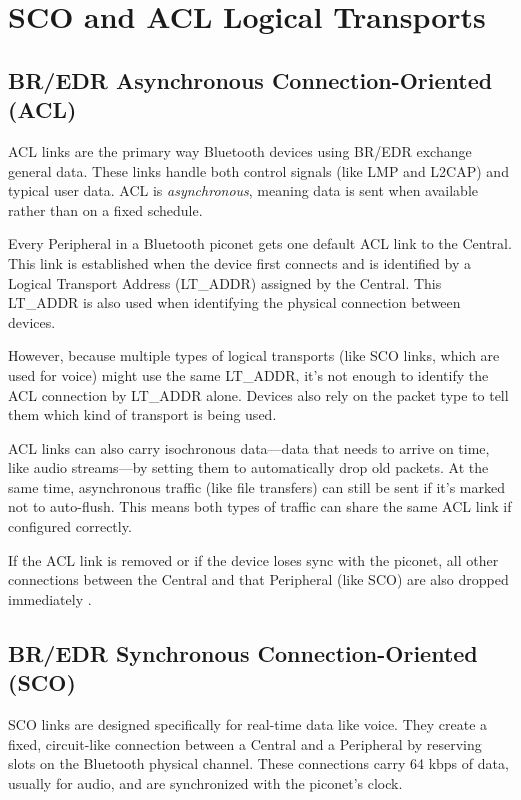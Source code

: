 \section{SCO and ACL Logical Transports}

\subsection{BR/EDR Asynchronous Connection-Oriented (ACL)}

ACL links are the primary way Bluetooth devices using BR/EDR exchange general data. These links handle both control signals (like LMP and L2CAP) and typical user data. ACL is \textit{asynchronous}, meaning data is sent when available rather than on a fixed schedule.

Every Peripheral in a Bluetooth piconet gets one default ACL link to the Central. This link is established when the device first connects and is identified by a Logical Transport Address (LT\_ADDR) assigned by the Central. This LT\_ADDR is also used when identifying the physical connection between devices.

However, because multiple types of logical transports (like SCO links, which are used for voice) might use the same LT\_ADDR, it’s not enough to identify the ACL connection by LT\_ADDR alone. Devices also rely on the packet type to tell them which kind of transport is being used.

ACL links can also carry isochronous data—data that needs to arrive on time, like audio streams—by setting them to automatically drop old packets. At the same time, asynchronous traffic (like file transfers) can still be sent if it’s marked not to auto-flush. This means both types of traffic can share the same ACL link if configured correctly.

If the ACL link is removed or if the device loses sync with the piconet, all other connections between the Central and that Peripheral (like SCO) are also dropped immediately \cite{bluetoothcorespec6}.

\subsection{BR/EDR Synchronous Connection-Oriented (SCO)}

SCO links are designed specifically for real-time data like voice. They create a fixed, circuit-like connection between a Central and a Peripheral by reserving slots on the Bluetooth physical channel. These connections carry 64 kbps of data, usually for audio, and are synchronized with the piconet’s clock.

